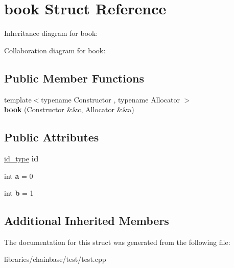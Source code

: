 \hypertarget{structbook}{}\section{book Struct Reference}
\label{structbook}


Inheritance diagram for book\+:


Collaboration diagram for book\+:
\subsection*{Public Member Functions}
\begin{DoxyCompactItemize}
\item 
\mbox{\label{structbook_a81f1584c0672cca9dd2298944ec7fe30}} 
{\footnotesize template$<$typename Constructor , typename Allocator $>$ }\\{\bfseries book} (Constructor \&\&c, Allocator \&\&a)
\end{DoxyCompactItemize}
\subsection*{Public Attributes}
\begin{DoxyCompactItemize}
\item 
\mbox{\label{structbook_acc37660e6c336aaa48aefd654f5fe04a}} 
\mbox{\hyperlink{classchainbase_1_1oid}{id\+\_\+type}} {\bfseries id}
\item 
\mbox{\label{structbook_a65565986ed9d713d8a888c008e446d52}} 
int {\bfseries a} = 0
\item 
\mbox{\label{structbook_a03b5e022845367e4a56d3edf751ad59b}} 
int {\bfseries b} = 1
\end{DoxyCompactItemize}
\subsection*{Additional Inherited Members}


The documentation for this struct was generated from the following file\+:\begin{DoxyCompactItemize}
\item 
libraries/chainbase/test/test.\+cpp\end{DoxyCompactItemize}
